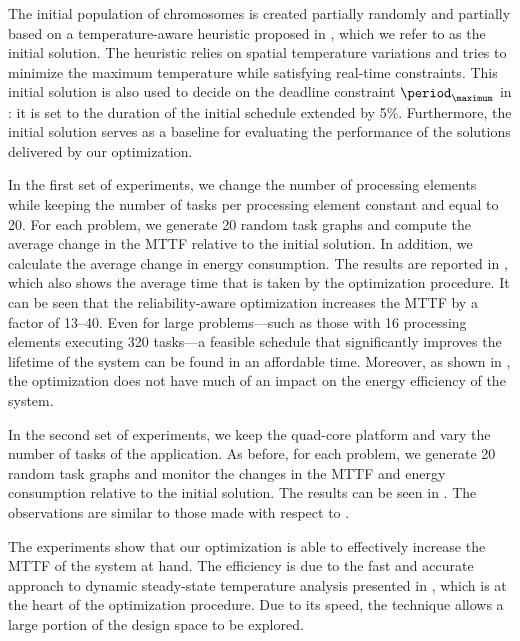 The initial population of chromosomes is created partially randomly and
partially based on a temperature-aware heuristic proposed in \cite{xie2006},
which we refer to as the initial solution. The heuristic relies on spatial
temperature variations and tries to minimize the maximum temperature while
satisfying real-time constraints. This initial solution is also used to decide
on the deadline constraint $\period_\maximum$ in
: it is set to the duration of the initial
schedule extended by 5\%. Furthermore, the initial solution serves as a baseline
for evaluating the performance of the solutions delivered by our optimization.

In the first set of experiments, we change the number of processing elements \np
while keeping the number of tasks \nt per processing element constant and equal
to 20. For each problem, we generate 20 random task graphs and compute the
average change in the \ac{MTTF} relative to the initial solution. In addition,
we calculate the average change in energy consumption. The results are reported
in , which also shows the average time that is
taken by the optimization procedure. It can be seen that the reliability-aware
optimization increases the \ac{MTTF} by a factor of 13--40. Even for large
problems---such as those with 16 processing elements executing 320 tasks---a
feasible schedule that significantly improves the lifetime of the system can be
found in an affordable time. Moreover, as shown in
, the optimization does not have much of an
impact on the energy efficiency of the system.

In the second set of experiments, we keep the quad-core platform and vary the
number of tasks \nt of the application. As before, for each problem, we generate
20 random task graphs and monitor the changes in the \ac{MTTF} and energy
consumption relative to the initial solution. The results can be seen in
. The observations are similar to those made with
respect to .

The experiments show that our optimization is able to effectively increase the
\ac{MTTF} of the system at hand. The efficiency is due to the fast and accurate
approach to dynamic steady-state temperature analysis presented in
, which is at the heart of the optimization
procedure. Due to its speed, the technique allows a large portion of the design
space to be explored.

